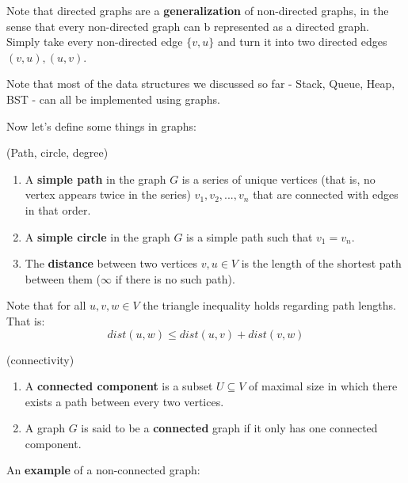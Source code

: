 \begin{remark}
Note that directed graphs are a \textbf{generalization} of non-directed graphs, in the sense that every non-directed graph can b represented as a directed graph. Simply take every non-directed edge $\{v,u\}$ and turn it into two directed edges $(v,u), (u,v)$. 
\end{remark}

\begin{remark}
Note that most of the data structures we discussed so far - Stack, Queue, Heap, BST - can all be implemented using graphs.
\end{remark}

Now let's define some things in graphs:

\begin{definition} (Path, circle, degree)
\begin{enumerate} 
\item A \textbf{simple path} in the graph $G$ is a series of unique vertices (that is, no vertex appears twice in the series) $v_1, v_2, ..., v_n$ that are connected with edges in that order. 
\item A \textbf{simple circle} in the graph $G$ is a simple path such that $v_1 = v_n$. 
\item The \textbf{distance} between two vertices $v,u\in V$ is the length of the shortest path between them ($\infty$ if there is no such path).
\end{enumerate}
\end{definition}

\begin{remark}
Note that for all $u,v,w\in V$ the triangle inequality holds regarding path lengths. That is:
$$dist(u,w)\leq dist(u,v) + dist(v, w)$$
\end{remark}

\begin{definition} (connectivity)
\begin{enumerate}
\item A \textbf{connected component} is a subset $U \subseteq V$ of maximal size in which there exists a path between every two vertices. 
\item A graph $G$ is said to be a \textbf{connected} graph if it only has one connected component.
\end{enumerate}
\end{definition}

An \textbf{example} of a non-connected graph: \\ \\ 

